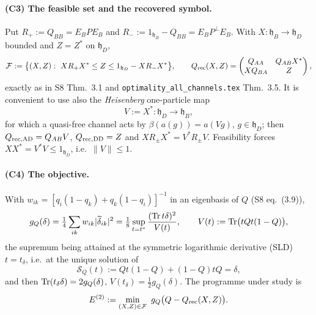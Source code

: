 \documentclass[11pt]{article}
\begin{document}
\paragraph{(C3) The feasible set and the recovered symbol.}
Put $R_+:=Q_{BB}=E_BPE_B$ and $R_-:=1_{\mathfrak h_B}-Q_{BB}=E_BP^\perp E_B$.  With
$X:\mathfrak h_B\to\mathfrak h_D$ bounded and $Z=Z^*$ on $\mathfrak h_D$,
\begin{equation}\label{eq:F}
 \mathcal F:=\bigl\{(X,Z):\ XR_+X^*\le Z\le 1_{\mathfrak h_D}-XR_-X^*\bigr\},\qquad
 Q_{\rm rec}(X,Z)=\begin{pmatrix}Q_{AA}&Q_{AB}X^*\\ XQ_{BA}&Z\end{pmatrix},
\end{equation}
exactly as in S8 Thm.~3.1 and \texttt{optimality\_all\_channels.tex} Thm.~3.5.  It is
convenient to use also the \emph{Heisenberg} one-particle map
\begin{equation}\label{eq:V}
 V:=X^*:\mathfrak h_D\to\mathfrak h_B ,
\end{equation}
for which a quasi-free channel acts by $\beta(a(g))=a(Vg)$, $g\in\mathfrak h_D$; then
$Q_{\rm rec,AD}=Q_{AB}V$, $Q_{\rm rec,DD}=Z$ and $XR_\pm X^*=V^*R_\pm V$.  Feasibility
forces $XX^*=V^*V\le 1_{\mathfrak h_D}$, i.e.\ $\|V\|\le1$.

\paragraph{(C4) The objective.}
With $w_{ik}=[q_i(1-q_k)+q_k(1-q_i)]^{-1}$ in an eigenbasis of $Q$ (S8 eq.~(3.9)),
\begin{equation}\label{eq:gQ}
 g_Q(\delta)=\tfrac14\sum_{ik}w_{ik}|\widetilde\delta_{ik}|^2
 =\tfrac18\sup_{t=t^*}\frac{(\operatorname{Tr} t\delta)^2}{V(t)},\qquad
 V(t):=\operatorname{Tr}\bigl(tQt(1-Q)\bigr),
\end{equation}
the supremum being attained at the symmetric logarithmic derivative (SLD) $t=t_\delta$,
i.e.\ at the unique solution of
\begin{equation}\label{eq:SLD}
 \mathcal S_Q(t):=Qt(1-Q)+(1-Q)tQ=\delta ,
\end{equation}
and then $\operatorname{Tr}(t_\delta\delta)=2g_Q(\delta)$, $V(t_\delta)=\tfrac12 g_Q(\delta)$.  The
programme under study is
\begin{equation}\label{eq:prog}
 E^{(2)}:=\min_{(X,Z)\in\mathcal F}\ g_Q\bigl(Q-Q_{\rm rec}(X,Z)\bigr).
\end{equation}
\end{document}
